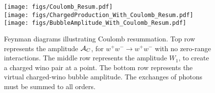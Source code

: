 \documentclass[%
 reprint,
 amsmath,amssymb,
 aps,
]{revtex4-1}
\begin{document}
\begin{figure}[t]
\centering
\texttt{[image: figs/Coulomb\_Resum.pdf]}
\\[0.5cm]
\texttt{[image: figs/ChargedProduction\_With\_Coulomb\_Resum.pdf]}
\\[0.5cm]
\texttt{[image: figs/BubbleAmplitude\_With\_Coulomb\_Resum.pdf]}

\caption{Feynman diagrams illustrating Coulomb resummation. 
Top row represents the amplitude ${\cal A}_C$, for $w^+ w^- \to w^+ w^-$ with no zero-range interactions.
The middle row represents the amplitude $W_1$, to create a charged wino pair at a point.
The bottom row represents the virtual charged-wino bubble amplitude.
The exchanges of photons must be summed to all orders.}
\label{fig:CoulombResum}
\end{figure}
\end{document}

